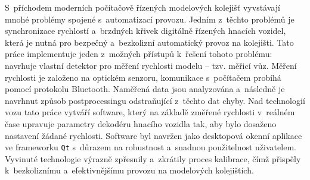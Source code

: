 S~příchodem moderních počítačově řízených modelových kolejišť vyvstávají mnohé
problémy spojené s~automatizací provozu. Jedním z~těchto problémů je
synchronizace rychlostí a~brzdných křivek digitálně řízených hnacích vozidel,
která je nutná pro bezpečný a~bezkolizní automatický provoz na kolejišti.
Tato práce implementuje jeden z~možných přístupů k~řešení tohoto problému:
navrhuje vlastní detektor pro měření rychlosti modelu -- tzv. měřicí vůz.
Měření rychlosti je založeno na optickém senzoru, komunikace s~počítačem
probíhá pomocí protokolu Bluetooth. Naměřená data jsou analyzována a~následně
je navrhnut způsob postprocessingu odstraňující z~těchto dat chyby.
Nad technologií vozu tato práce vytváří software, který na základě změřené
rychlosti v~reálném čase upravuje parametry dekodéru hnacího vozidla tak, aby
bylo dosaženo nastavení žádané rychlosti. Software byl navržen jako desktopová
okenní aplikace ve frameworku \texttt{Qt} s~důrazem na robustnost a~snadnou
použitelnost uživatelem. Vyvinuté technologie výrazně zpřesnily a~zkrátily
proces kalibrace, čímž přispěly k~bezkoliznímu a~efektivnějšímu provozu
na modelových kolejištích.

